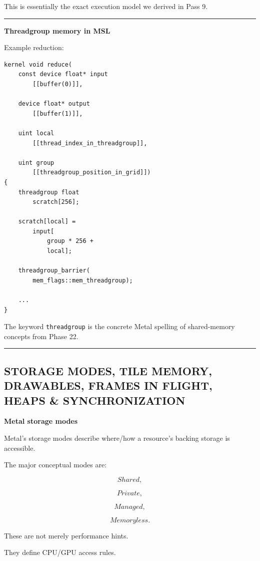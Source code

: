 This is essentially the exact execution model we derived in Pass 9.

\begin{center}\rule{0.5\linewidth}{0.5pt}\end{center}

\textbf{Threadgroup memory in MSL}

Example reduction:

\begin{verbatim}
kernel void reduce(
    const device float* input
        [[buffer(0)]],

    device float* output
        [[buffer(1)]],

    uint local
        [[thread_index_in_threadgroup]],

    uint group
        [[threadgroup_position_in_grid]])
{
    threadgroup float
        scratch[256];

    scratch[local] =
        input[
            group * 256 +
            local];

    threadgroup_barrier(
        mem_flags::mem_threadgroup);

    ...
}
\end{verbatim}

The keyword \texttt{threadgroup} is the concrete Metal spelling of shared-memory concepts from Phase 22.

\begin{center}\rule{0.5\linewidth}{0.5pt}\end{center}

\subsection{STORAGE MODES, TILE MEMORY, DRAWABLES, FRAMES IN FLIGHT, HEAPS \& SYNCHRONIZATION}\label{01-foundations-i-ch015-storage-modes-tile-memory-drawables-frames-in-flight-heaps-synchronization}

\textbf{Metal storage modes}

Metal's storage modes describe where/how a resource's backing storage is accessible.

The major conceptual modes are:

\[
Shared,
\]

\[
Private,
\]

\[
Managed,
\]

\[
Memoryless.
\]

These are not merely performance hints.

They define CPU/GPU access rules.

